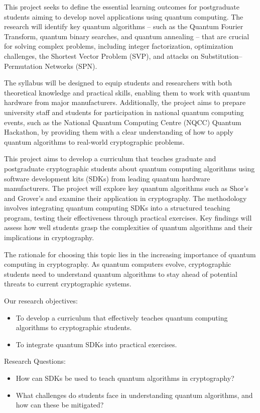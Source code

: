 \documentclass[11pt,a4paper]{article}
\begin{document}
This project seeks to define the essential learning outcomes for postgraduate students aiming to develop novel
applications using quantum computing.
The research will identify key quantum algorithms -- such as the Quantum Fourier Transform, quantum binary searches,
and quantum annealing -- that are crucial for solving complex problems, including integer factorization,
optimization challenges, the Shortest Vector Problem (SVP), and attacks on Substitution–Permutation Networks (SPN).

The syllabus will be designed to equip students and researchers with both theoretical knowledge and practical skills,
enabling them to work with quantum hardware from major manufacturers.
Additionally, the project aims to prepare university staff and students for participation in national quantum
computing events, such as the National Quantum Computing Centre (NQCC) Quantum Hackathon, by providing them with a
clear understanding of how to apply quantum algorithms to real-world cryptographic problems.

This project aims to develop a curriculum that teaches graduate and postgraduate cryptographic students about quantum
computing algorithms using software development kits (SDKs) from leading quantum hardware manufacturers.
The project will explore key quantum algorithms such as Shor’s and Grover’s and examine their application
in cryptography.
The methodology involves integrating quantum computing SDKs into a structured teaching program, testing their
effectiveness through practical exercises.
Key findings will assess how well students grasp the complexities of quantum algorithms and their implications
in cryptography.

The rationale for choosing this topic lies in the increasing importance of quantum computing in cryptography.
As quantum computers evolve, cryptographic students need to understand quantum algorithms to stay ahead of potential
threats to current cryptographic systems.

Our research objectives:
\begin{itemize}
\item To develop a curriculum that effectively teaches quantum computing algorithms to cryptographic students.
\item To integrate quantum SDKs into practical exercises.
\end{itemize}

Research Questions:
\begin{itemize}
\item How can SDKs be used to teach quantum algorithms in cryptography?
\item What challenges do students face in understanding quantum algorithms, and how can these be mitigated?
\end{itemize}
\end{document}
